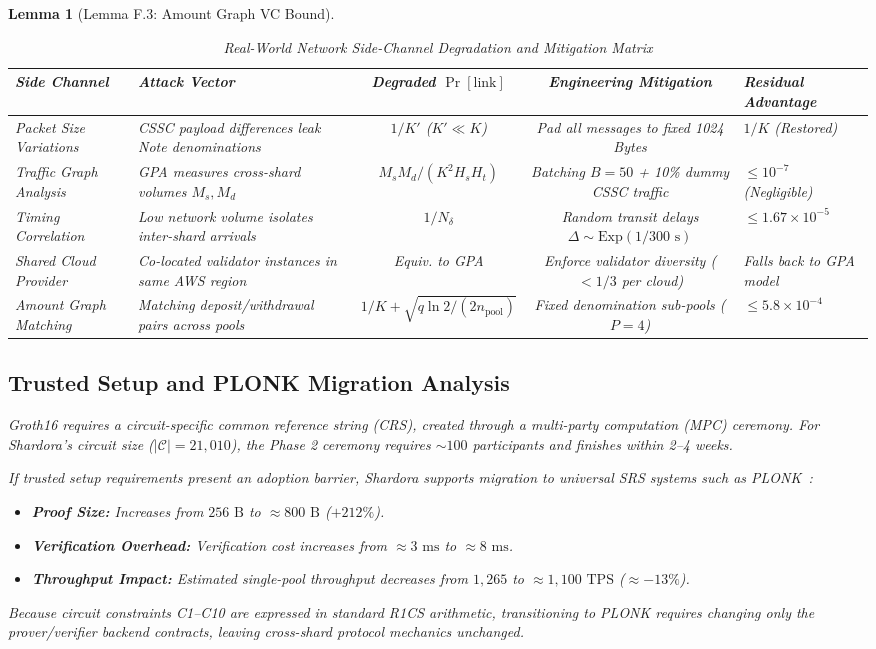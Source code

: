 \documentclass[journal,10pt,twocolumn]{IEEEtran}
\newtheorem{lemma}[theorem]{Lemma}
\theoremstyle{definition}
\theoremstyle{remark}
\begin{document}
\begin{lemma}[Lemma F.3: Amount Graph VC Bound]
\begin{table}[t]
\centering
\caption{Real-World Network Side-Channel Degradation and Mitigation Matrix}
\label{tab:side_channel_matrix}
\small
\begin{tabularx}{\textwidth}{lXccX}
\toprule
\textbf{Side Channel} & \textbf{Attack Vector} & \textbf{Degraded $\Pr[\text{link}]$} & \textbf{Engineering Mitigation} & \textbf{Residual Advantage} \\
\midrule
Packet Size Variations & CSSC payload differences leak Note denominations & $1/K'$ ($K' \ll K$) & Pad all messages to fixed 1024 Bytes & $1/K$ (Restored) \\
Traffic Graph Analysis & GPA measures cross-shard volumes $M_s, M_d$ & $M_s M_d / (K^2 H_s H_t)$ & Batching $B=50$ + 10\% dummy CSSC traffic & $\le 10^{-7}$ (Negligible) \\
Timing Correlation & Low network volume isolates inter-shard arrivals & $1/N_\delta$ & Random transit delays $\Delta \sim \text{Exp}(1/300\text{ s})$ & $\le 1.67 \times 10^{-5}$ \\
Shared Cloud Provider & Co-located validator instances in same AWS region & Equiv. to GPA & Enforce validator diversity ($< 1/3$ per cloud) & Falls back to GPA model \\
Amount Graph Matching & Matching deposit/withdrawal pairs across pools & $1/K + \sqrt{q\ln 2 / (2n_{\text{pool}})}$ & Fixed denomination sub-pools ($P=4$) & $\le 5.8 \times 10^{-4}$ \\
\bottomrule
\end{tabularx}
\end{table}

\subsection{Trusted Setup and PLONK Migration Analysis}
Groth16 requires a circuit-specific common reference string (CRS), created through a multi-party computation (MPC) ceremony. For Shardora's circuit size ($|\mathcal{C}| = 21,010$), the Phase 2 ceremony requires $\sim 100$ participants and finishes within 2--4 weeks.

If trusted setup requirements present an adoption barrier, Shardora supports migration to universal SRS systems such as PLONK~\cite{gabizon2019plonk}:
\begin{itemize}[leftmargin=*]
    \item \textbf{Proof Size:} Increases from $256\text{ B}$ to $\approx 800\text{ B}$ ($+212\%$).
    \item \textbf{Verification Overhead:} Verification cost increases from $\approx 3\text{ ms}$ to $\approx 8\text{ ms}$.
    \item \textbf{Throughput Impact:} Estimated single-pool throughput decreases from $1,265$ to $\approx 1,100\text{ TPS}$ ($\approx -13\%$).
\end{itemize}
Because circuit constraints C1--C10 are expressed in standard R1CS arithmetic, transitioning to PLONK requires changing only the prover/verifier backend contracts, leaving cross-shard protocol mechanics unchanged.


\end{lemma}
\end{document}
